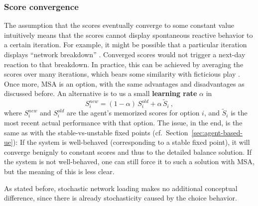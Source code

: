 \subsubsection{Score convergence}
\label{sec:score-convergence}

The assumption that the scores
eventually converge to
some constant value intuitively means that the scores cannot display
spontaneous reactive behavior to a certain iteration.  For example, it
might be possible that a particular iteration displays ``network
breakdown'' \citep{RieserNagel2008NetworkBreakdown}.  Converged scores
would not trigger a next-day reaction to that breakdown.  In practice,
this can be achieved by averaging the scores over many iterations,
which bears some similarity with ficticious play 
\citep{monderer-1996, garcia-2000}.
Once more, MSA is an option, with the same advantages and
disadvantages as discussed before.  An alternative is to us a small
\textbf{learning rate} $\alpha$ in
\begin{equation}
S_i^{new} = (1-\alpha) \, S_i^{old} + \alpha \, \tilde S_i \ ,
\end{equation}
where $S_i^{new}$ and $S_i^{old}$ are the agent's memorized scores for
option $i$, and $\tilde S_i$ is the most recent actual performance
with that option.  The issue, in the end, is the same as with the
stable-vs-unstable fixed points (cf.~Section~\ref{sec:agent-based-ue}):
If the system is well-behaved (corresponding to a stable fixed point),
it will converge benignly to constant scores and thus to the detailed
balance solution.  If the system is not well-behaved, one can still
force it to such a solution with MSA, but the meaning of this is less
clear.

As stated before, stochastic network loading makes no additional
conceptual difference, since there is already stochasticity caused by
the choice behavior.



